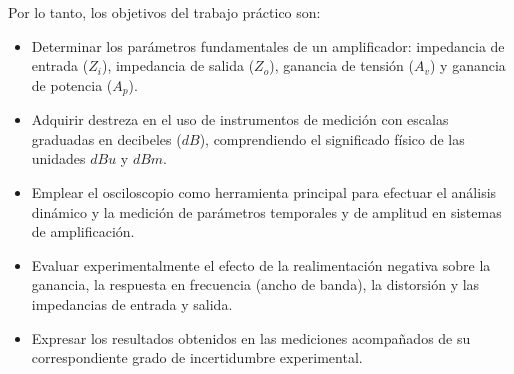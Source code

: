 Por lo tanto, los objetivos del trabajo práctico son:
\begin{itemize}
    \item Determinar los parámetros fundamentales de un amplificador: impedancia de entrada ($Z_i$),
          impedancia de salida ($Z_o$), ganancia de tensión ($A_v$) y ganancia de potencia ($A_p$).
    \item Adquirir destreza en el uso de instrumentos de medición con escalas graduadas en decibeles ($dB$),
          comprendiendo el significado físico de las unidades $dBu$ y $dBm$.
    \item Emplear el osciloscopio como herramienta principal para efectuar el análisis dinámico y la
          medición de parámetros temporales y de amplitud en sistemas de amplificación.
    \item Evaluar experimentalmente el efecto de la realimentación negativa sobre la ganancia, la respuesta
          en frecuencia (ancho de banda), la distorsión y las impedancias de entrada y salida.
    \item Expresar los resultados obtenidos en las mediciones acompañados de su correspondiente grado de
          incertidumbre experimental.
\end{itemize}


